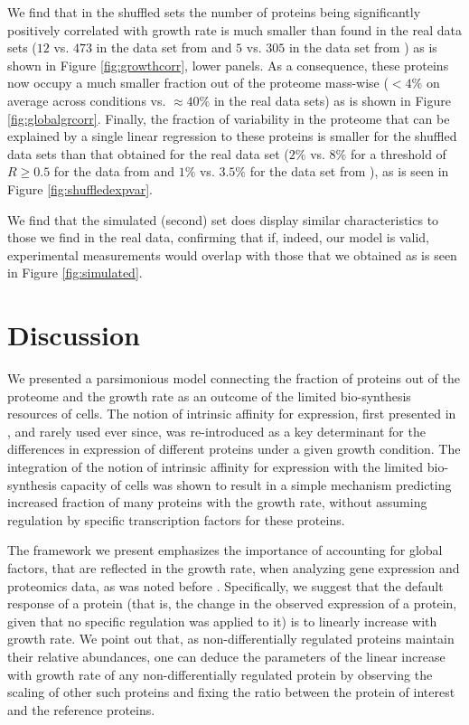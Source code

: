 \documentclass{article}
\newcommand{\hGlobal}{$473$}
\newcommand{\hGlobalShuff}{$12$}
\newcommand{\vnGlobalShuff}{$5$}
\newcommand{\vGlobalShuff}{\vnGlobalShuff{}}
\newcommand{\vnGlobal}{$305$}
\newcommand{\vGlobal}{\vnGlobal{}}
\begin{document}
We find that in the shuffled sets the number of proteins being significantly positively correlated with
growth rate is much smaller than found in the real data sets (\hGlobalShuff{} vs. \hGlobal{} in the data set from \cite{Heinemann2015} and \vGlobalShuff{} vs. \vGlobal{} in the data set from \cite{Peebo_2015}) as is shown in Figure \ref{fig:growthcorr}, lower panels.
As a consequence, these proteins now occupy a much smaller fraction out of the proteome mass-wise ($<4\%$ on average across conditions vs. $\approx 40\%$ in the real data sets) as is shown in Figure \ref{fig:globalgrcorr}.
Finally, the fraction of variability in the proteome that can be explained by a single linear regression to these proteins is smaller for the shuffled data sets than that obtained for the real data set ($2\%$ vs. $8\%$ for a threshold of $R\ge0.5$ for the data from \cite{Heinemann2015} and $1\%$ vs. $3.5\%$ for the data set from \cite{Peebo_2015}), as is seen in Figure \ref{fig:shuffledexpvar}.

We find that the simulated (second) set does display similar characteristics to those we find in the real data, confirming that if, indeed, our model is valid, experimental measurements would overlap with those that we obtained as is seen in Figure \ref{fig:simulated}.

\section{Discussion}
We presented a parsimonious model connecting the fraction of proteins out of the proteome and the growth rate as an outcome of the limited bio-synthesis resources of cells. 
The notion of intrinsic affinity for expression, first presented in \cite{Maaloe1969}, and rarely used ever since, was re-introduced as a key determinant for the differences in expression of different proteins under a given growth condition.
The integration of the notion of intrinsic affinity for expression with the limited bio-synthesis capacity of cells was shown to result in a simple mechanism predicting increased fraction of many proteins with the growth rate, without assuming regulation by specific transcription factors for these proteins.

The framework we present emphasizes the importance of accounting for global factors, that are reflected in the growth rate, when analyzing gene expression and proteomics data, as was noted before \cite{Maaloe1969,Brauer2008,Klumpp2009,Klumpp2014,Scott2010,Berthoumieux2013,Keren2013,Gerosa2013,Valgepea2013,Hui_2015,Peebo_2015,Wei_e_2015}.
Specifically, we suggest that the default response of a protein (that is, the change in the observed expression of a protein, given that no specific regulation was applied to it) is to linearly increase with growth rate.
We point out that, as non-differentially regulated proteins maintain their relative abundances, one can deduce the parameters of the linear increase with growth rate of any non-differentially regulated protein by observing the scaling of other such proteins and fixing the ratio between the protein of interest and the reference proteins.
\end{document}
